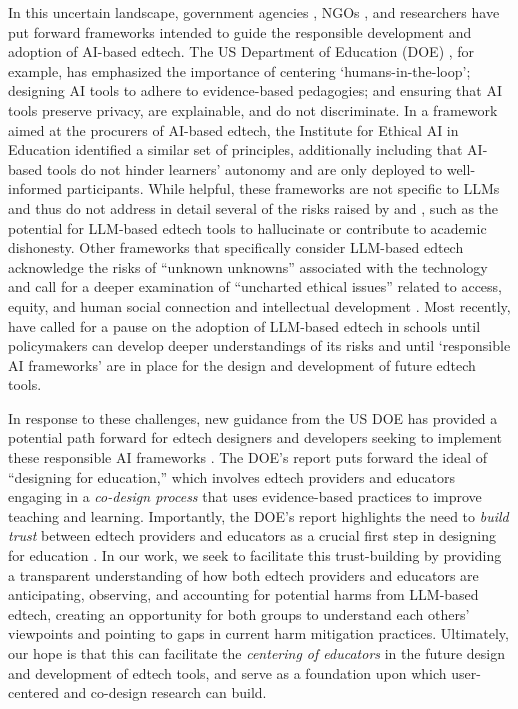 In this uncertain landscape, government agencies \cite{cardona_artificial_2023, noauthor_guidance_2023}, NGOs \cite{noauthor_ethical_2021}, and researchers \cite{KASNECI2023102274, williamson_time_2024} have put forward frameworks intended to guide the responsible development and adoption of AI-based edtech. The US Department of Education (DOE) \cite{cardona_artificial_2023}, for example, has emphasized the importance of centering `humans-in-the-loop'; designing AI tools to adhere to evidence-based pedagogies; and ensuring that AI tools preserve privacy, are explainable, and do not discriminate. In a framework aimed at the procurers of AI-based edtech, the Institute for Ethical AI in Education \cite{noauthor_ethical_2021} identified a similar set of principles, additionally including that AI-based tools do not hinder learners' autonomy and are only deployed to well-informed participants. While helpful, these frameworks are not specific to LLMs and thus do not address in detail several of the risks raised by \citet{bender_dangers_2021} and \citet{weidinger_taxonomy_2022}, such as the potential for LLM-based edtech tools to hallucinate or contribute to academic dishonesty. Other frameworks that specifically consider LLM-based edtech acknowledge the risks of ``unknown unknowns'' \cite{KASNECI2023102274} associated with the technology and call for a deeper examination of ``uncharted ethical issues'' related to access, equity, and human social connection and intellectual development \cite{noauthor_guidance_2023}. Most recently, \citet{williamson_time_2024} have called for a pause on the adoption of LLM-based edtech in schools until policymakers can develop deeper understandings of its risks and until `responsible AI frameworks' are in place for the design and development of future edtech tools. 

In response to these challenges, new guidance from the US DOE has provided a potential path forward for edtech designers and developers seeking to implement these responsible AI frameworks \cite{cardona_designing_2024}. The DOE's report puts forward the ideal of ``designing for education,'' which involves edtech providers and educators engaging in a \textit{co-design process} that uses evidence-based practices to improve teaching and learning. Importantly, the DOE's report highlights the need to \textit{build trust} between edtech providers and educators as a crucial first step in designing for education \cite{cardona_designing_2024}. In our work, we seek to facilitate this trust-building by providing a transparent understanding of how both edtech providers and educators are anticipating, observing, and accounting for potential harms from LLM-based edtech, creating an opportunity for both groups to understand each others' viewpoints and pointing to gaps in current harm mitigation practices. Ultimately, our hope is that this can facilitate the \textit{centering of educators} in the future design and development of edtech tools, and serve as a foundation upon which user-centered and co-design research can build.